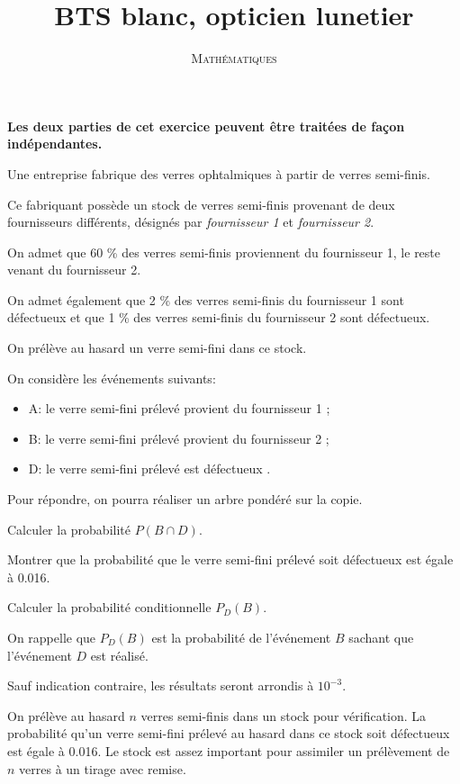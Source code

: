 \documentclass[a4paper,12pt]{scrartcl}
\date{}
\title{BTS blanc, opticien lunetier}
\author{\textsc{Mathématiques}}
\begin{document}
\maketitle

\textbf{Les deux parties de cet exercice peuvent être traitées de façon indépendantes.}

Une entreprise fabrique des verres ophtalmiques à partir de verres semi-finis.


Ce fabriquant possède un stock de verres semi-finis provenant de deux fournisseurs différents, désignés par \emph{fournisseur 1} et \emph{fournisseur 2}.

On admet que 60 \% des verres semi-finis proviennent du fournisseur 1, le reste venant du fournisseur 2.

On admet également que 2 \% des verres semi-finis du fournisseur 1 sont défectueux et que 1 \% des verres semi-finis du fournisseur 2 sont défectueux.

On prélève au hasard un verre semi-fini dans ce stock.

On considère les événements suivants:

\begin{itemize}
\item A: \og le verre semi-fini prélevé provient du fournisseur 1 \fg{};
\item B: \og le verre semi-fini prélevé provient du fournisseur 2 \fg{};
\item D: \og le verre semi-fini prélevé est défectueux \fg{}.
\end{itemize}

Pour répondre, on pourra réaliser un arbre pondéré sur la copie. 

\question{}
Calculer la probabilité $P(B \cap D)$.

\question{}
Montrer que la probabilité que le verre semi-fini prélevé soit défectueux est égale à 0.016.

\question{}
Calculer la probabilité conditionnelle $P_D(B)$.

On rappelle que $P_D(B)$ est la probabilité de l'événement $B$ sachant que l'événement $D$ est réalisé.


Sauf indication contraire, les résultats seront arrondis à $10^{-3}$. 

On prélève au hasard $n$ verres semi-finis dans un stock pour vérification. La probabilité qu'un verre semi-fini prélevé au hasard dans ce stock soit défectueux est égale à 0.016. Le stock est assez important pour assimiler un prélèvement de $n$ verres à un tirage avec remise.
\end{document}
